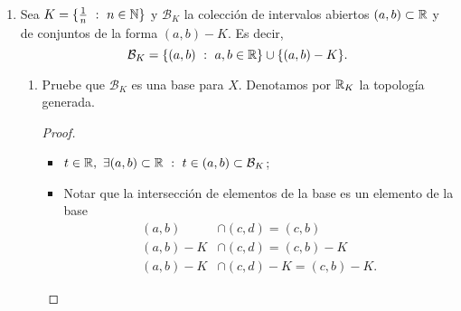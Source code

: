 \documentclass[a4paper]{report}
\begin{document}
\begin{enumerate}
\begin{enumerate}
\begin{proof}
\begin{itemize}
				\item $U_1,\dots,U_n \in \tau_2 \implies p \not\in U_i \implies p \not\in \displaystyle\bigcap_{i=1}^{n} U_i \implies \displaystyle\bigcap_{i=1}^{n} U_i \in \tau_2$.
			\end{itemize}
		\end{proof}

		\item Determine cuando
		\[
		\tau_3 = \{ U \subset X \ : \ U = X \text{ o } X \setminus U \text{ es infinito} \}
		\]
		es una topología en $X$.
		\begin{proof}~
			Si $p \in X \implies \{ p \}^c$ es infinito $\implies \{ p \}$ es abierto. Si $\tau_3$ es topología y $q \in X$, entonces
			\[
			\bigcup_{p \neq q} \{ p \} = X \setminus \{ q \} \implies (X \setminus \{ q \})^c = \{ q \}
			\]
			es infinito. Contradicción! \textreferencemark \ Es decir, $\tau_3$ no es topología.
		\end{proof}
	\end{enumerate}

	\item Sea $K = \{ \frac{1}{n} \ : \ n \in \mathbb{N} \}$ y $\mathcal{B}_K$ la colección de intervalos abiertos $(a,b) \subset \mathbb{R}$ y de conjuntos de la forma $(a,b) - K$. Es decir,
	\[
	\mathcal{B}_K = \{ (a,b) \ : \ a,b \in \R \} \cup \{ (a,b)-K \}.
	\]
	\begin{enumerate}
		\item Pruebe que $\mathcal{B}_K$ es una base para $X$. Denotamos por $\mathbb{R}_K$ la topología generada.
		\begin{proof}~
			\begin{itemize}
				\item $t \in \R,\ \exists (a,b) \subset \R \ : \ t \in (a,b) \subset \mathcal{B}_K$;

				\item Notar que la intersección de elementos de la base es un elemento de la base
				\begin{align*}
					(a,b) & \cap (c,d)  = (c,b) \\
					(a,b)-K & \cap (c,d)  = (c,b)-K \\
					(a,b)-K & \cap (c,d)-K  = (c,b)-K
				.\end{align*}
			\end{itemize}
		\end{proof}


\end{enumerate}
\end{enumerate}
\end{document}
